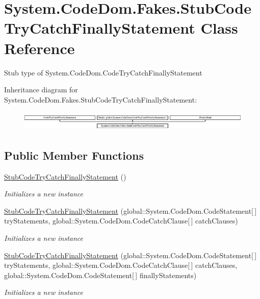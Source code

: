 \hypertarget{class_system_1_1_code_dom_1_1_fakes_1_1_stub_code_try_catch_finally_statement}{\section{System.\-Code\-Dom.\-Fakes.\-Stub\-Code\-Try\-Catch\-Finally\-Statement Class Reference}
\label{class_system_1_1_code_dom_1_1_fakes_1_1_stub_code_try_catch_finally_statement}
}


Stub type of System.\-Code\-Dom.\-Code\-Try\-Catch\-Finally\-Statement 


Inheritance diagram for System.\-Code\-Dom.\-Fakes.\-Stub\-Code\-Try\-Catch\-Finally\-Statement\-:\begin{figure}[H]
\begin{center}
\leavevmode
\includegraphics[height=0.964686cm]{class_system_1_1_code_dom_1_1_fakes_1_1_stub_code_try_catch_finally_statement}
\end{center}
\end{figure}
\subsection*{Public Member Functions}
\begin{DoxyCompactItemize}
\item 
\hyperlink{class_system_1_1_code_dom_1_1_fakes_1_1_stub_code_try_catch_finally_statement_a3a29aff2f6cb51a115e769d9b4460de7}{Stub\-Code\-Try\-Catch\-Finally\-Statement} ()
\begin{DoxyCompactList}\small\item\em Initializes a new instance\end{DoxyCompactList}\item 
\hyperlink{class_system_1_1_code_dom_1_1_fakes_1_1_stub_code_try_catch_finally_statement_a92407f4031ab62c6c621ad5163b58fee}{Stub\-Code\-Try\-Catch\-Finally\-Statement} (global\-::\-System.\-Code\-Dom.\-Code\-Statement\mbox{[}$\,$\mbox{]} try\-Statements, global\-::\-System.\-Code\-Dom.\-Code\-Catch\-Clause\mbox{[}$\,$\mbox{]} catch\-Clauses)
\begin{DoxyCompactList}\small\item\em Initializes a new instance\end{DoxyCompactList}\item 
\hyperlink{class_system_1_1_code_dom_1_1_fakes_1_1_stub_code_try_catch_finally_statement_abbde2f876d89e8dc56dff97deb97c8b4}{Stub\-Code\-Try\-Catch\-Finally\-Statement} (global\-::\-System.\-Code\-Dom.\-Code\-Statement\mbox{[}$\,$\mbox{]} try\-Statements, global\-::\-System.\-Code\-Dom.\-Code\-Catch\-Clause\mbox{[}$\,$\mbox{]} catch\-Clauses, global\-::\-System.\-Code\-Dom.\-Code\-Statement\mbox{[}$\,$\mbox{]} finally\-Statements)
\begin{DoxyCompactList}\small\item\em Initializes a new instance\end{DoxyCompactList}\end{DoxyCompactItemize}
